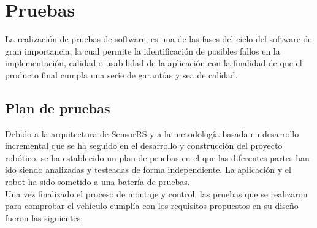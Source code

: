 

\newpage

\chapter{ Pruebas }
\label{chap:pruebas}

La realización de pruebas de software, es una de las fases del ciclo del software de gran importancia, la cual permite la identificación de posibles fallos en la implementación, 
calidad o usabilidad de la aplicación con la finalidad de que el producto final cumpla una serie de garantías y sea de calidad.\\

\section{Plan de pruebas}

Debido a la arquitectura de SensorRS y a la metodología basada en desarrollo incremental que se ha seguido en el desarrollo y construcción del proyecto robótico,
se ha establecido un plan de pruebas en el que las diferentes partes han ido siendo analizadas y testeadas de forma independiente. La aplicación y el robot ha sido sometido 
a una batería de pruebas. \\

Una vez finalizado el proceso de montaje y control, las pruebas que se realizaron para comprobar el vehículo cumplía con los requisitos propuestos en su diseño fueron las siguientes:\\

